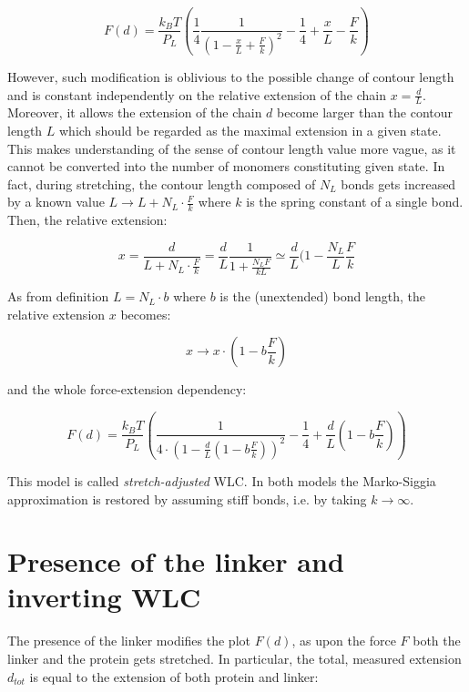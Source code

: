 \begin{equation}
    \boxed{F(d)=\frac{k_BT}{P_L}\left({\frac {1}{4}}\frac{1}{(1-{\frac {x}{L}}+{\frac {F}{k}})^{2}}-{\frac {1}{4}}+{\frac {x}{L}}-{\frac {F}{k}}\right)}
\end{equation}

However, such modification is oblivious to the possible change of contour length and is constant independently on the relative extension of the chain $x=\frac{d}{L}$.
Moreover, it allows the extension of the chain $d$ become larger than the contour length $L$ which should be regarded as the maximal extension in a given state.
This makes understanding of the sense of contour length value more vague, as it cannot be converted into the number of monomers constituting given state.
In fact, during stretching, the contour length composed of $N_L$ bonds gets increased by a known value $L\rightarrow L+N_L\cdot\frac{F}{k}$ where $k$ is the spring constant of a single bond. Then, the relative extension:

\begin{equation}
    x=\frac{d}{L+N_L\cdot\frac{F}{k}}=\frac{d}{L}\frac{1}{1+\frac{N_LF}{kL}}\simeq\frac{d}{L}(1-\frac{N_L}{L}\frac{F}{k}
\end{equation}

As from definition $L=N_L\cdot b$ where $b$ is the (unextended) bond length, the relative extension $x$ becomes:

\begin{equation}
    x\rightarrow x\cdot \left( 1-b\frac{F}{k}\right)
\end{equation}

and the whole force-extension dependency:

\begin{equation}
    \boxed{F(d)=\frac{k_BT}{P_L}\left(\frac{1}{4\cdot(1-\frac{d}{L}(1-b\frac{F}{k}))^2} - \frac{1}{4} + \frac{d}{L}(1-b\frac{F}{k})\right)}
\end{equation}

This model is called \textit{stretch-adjusted} WLC.
In both models the Marko-Siggia approximation is restored by assuming stiff bonds, i.e. by taking $k\rightarrow \infty$.

\section{Presence of the linker and inverting WLC}
\label{sec:theory_linker}
The presence of the linker modifies the plot $F(d)$, as upon the force $F$ both the linker and the protein gets stretched.
In particular, the total, measured extension $d_{tot}$ is equal to the extension of both protein and linker:

